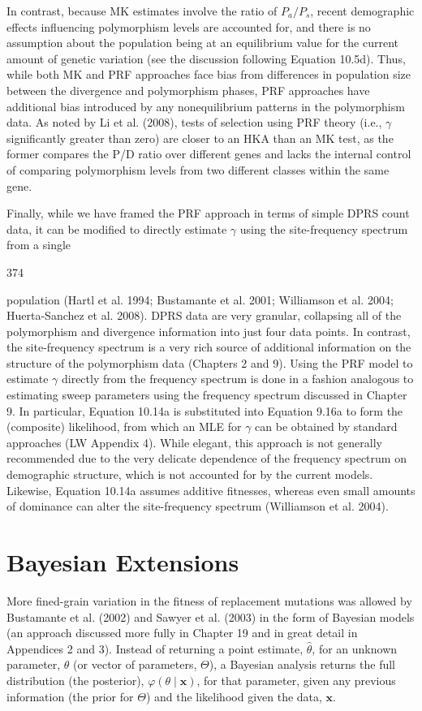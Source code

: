 \documentclass{article}
\begin{document}
In contrast, because MK estimates involve the ratio of  $ P_a / P_s $, recent demographic effects influencing polymorphism levels are accounted for, and there is no assumption about the population being at an equilibrium value for the current amount of genetic variation (see the discussion following Equation 10.5d). Thus, while both MK and PRF approaches face bias from differences in population size between the divergence and polymorphism phases, PRF approaches have additional bias introduced by any nonequilibrium patterns in the polymorphism data. As noted by Li et al. (2008), tests of selection using PRF theory (i.e.,  $ \gamma $ significantly greater than zero) are closer to an HKA than an MK test, as the former compares the P/D ratio over different genes and lacks the internal control of comparing polymorphism levels from two different classes within the same gene.

Finally, while we have framed the PRF approach in terms of simple DPRS count data, it can be modified to directly estimate  $ \gamma $ using the site-frequency spectrum from a single

374

population (Hartl et al. 1994; Bustamante et al. 2001; Williamson et al. 2004; Huerta-Sanchez et al. 2008). DPRS data are very granular, collapsing all of the polymorphism and divergence information into just four data points. In contrast, the site-frequency spectrum is a very rich source of additional information on the structure of the polymorphism data (Chapters 2 and 9). Using the PRF model to estimate  $ \gamma $ directly from the frequency spectrum is done in a fashion analogous to estimating sweep parameters using the frequency spectrum discussed in Chapter 9. In particular, Equation 10.14a is substituted into Equation 9.16a to form the (composite) likelihood, from which an MLE for  $ \gamma $ can be obtained by standard approaches (LW Appendix 4). While elegant, this approach is not generally recommended due to the very delicate dependence of the frequency spectrum on demographic structure, which is not accounted for by the current models. Likewise, Equation 10.14a assumes additive fitnesses, whereas even small amounts of dominance can alter the site-frequency spectrum (Williamson et al. 2004).

\section{Bayesian Extensions}
More fined-grain variation in the fitness of replacement mutations was allowed by Bustamante et al. (2002) and Sawyer et al. (2003) in the form of Bayesian models (an approach discussed more fully in Chapter 19 and in great detail in Appendices 2 and 3). Instead of returning a point estimate,  $ \widehat{\theta} $, for an unknown parameter,  $ \theta $ (or vector of parameters,  $ \Theta $), a Bayesian analysis returns the full distribution (the posterior),  $ \varphi(\theta \mid \mathbf{x}) $, for that parameter, given any previous information (the prior for  $ \Theta $) and the likelihood given the data,  $ \mathbf{x} $.
\end{document}
